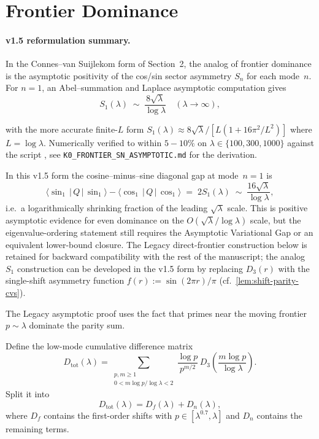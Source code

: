 \documentclass[11pt,a4paper]{article}
\theoremstyle{remark}
\theoremstyle{plain}
\begin{document}
\section{Frontier Dominance}
\label{sec:frontier}

\paragraph{v1.5 reformulation summary.}  In the Connes--van Suijlekom
form of Section~2, the analog of frontier dominance is the asymptotic
positivity of the cos/sin sector asymmetry $S_n$ for each mode~$n$.
For $n=1$, an Abel--summation and Laplace asymptotic computation
gives
\begin{equation}
\label{eq:S1-asymptotic-cvs}
  S_1(\lambda) \;\sim\; \frac{8\sqrt\lambda}{\log\lambda}
  \quad (\lambda\to\infty),
\end{equation}
\begin{sloppypar}
with the more accurate finite-$L$ form
$S_1(\lambda) \approx 8\sqrt\lambda/[L(1+16\pi^2/L^2)]$ where
$L=\log\lambda$.  Numerically verified to within $5{-}10\%$ on
$\lambda\in\{100,300,1000\}$ against the script
, see
\texttt{K0\_FRONTIER\_SN\_ASYMPTOTIC.md} for the
derivation.
\end{sloppypar}  In this v1.5 form the cosine--minus--sine diagonal gap at
mode~$n=1$ is
\[
  \langle\sin_1\,|\,Q\,|\,\sin_1\rangle
    - \langle\cos_1\,|\,Q\,|\,\cos_1\rangle
  \;=\; 2 S_1(\lambda)
  \;\sim\; \frac{16\sqrt\lambda}{\log\lambda},
\]
i.e.\ a logarithmically shrinking fraction of the leading
$\sqrt\lambda$ scale.  This is positive asymptotic evidence for even dominance
on the $O(\sqrt\lambda/\log\lambda)$ scale, but the eigenvalue-ordering
statement still requires the Asymptotic Variational Gap or an equivalent
lower-bound closure.  The Legacy
direct-frontier construction below is retained for backward
compatibility with the rest of the manuscript; the analog $S_1$
construction can be developed in the v1.5 form by replacing
$D_3(r)$ with the single-shift asymmetry function
$f(r):=\sin(2\pi r)/\pi$ (cf.\ \cref{lem:shift-parity-cvs}).

\bigskip

The Legacy asymptotic proof uses the fact that primes near the moving frontier
$p\sim\lambda$ dominate the parity sum.

Define the low-mode cumulative difference matrix
\[
  D_{\mathrm{tot}}(\lambda)=
  \sum_{\substack{p,m\geq1\\0<m\log p/\log\lambda<2}}
  \frac{\log p}{p^{m/2}}\,
  D_3\!\left(\frac{m\log p}{\log\lambda}\right).
\]
Split it into
\[
  D_{\mathrm{tot}}(\lambda)=D_f(\lambda)+D_n(\lambda),
\]
where $D_f$ contains the first-order shifts with
$p\in[\lambda^{0.7},\lambda]$ and $D_n$ contains the remaining terms.
\end{document}

